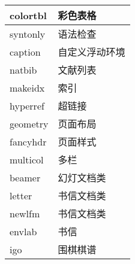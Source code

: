 \begin{longtable}{ll}
    colortbl & 彩色表格 \\
    \midrule
    syntonly & 语法检查 \\
    caption & 自定义浮动环境 \\
    natbib & 文献列表 \\
    makeidx & 索引 \\
    hyperref & 超链接 \\
    \midrule
    geometry & 页面布局 \\
    fancyhdr & 页面样式 \\
    multicol & 多栏 \\
    \midrule
    beamer & 幻灯文档类 \\
    letter & 书信文档类 \\
    newlfm & 书信文档类 \\
    envlab & 书信 \\
    igo & 围棋棋谱 \\
\end{longtable}
